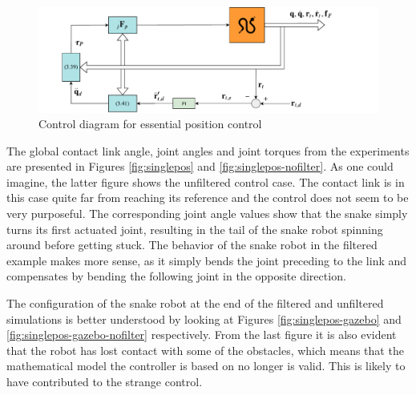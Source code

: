 \begin{figure}[H]
    \centering
    \includegraphics[trim=1cm 0cm 3cm 0cm, clip=true, width=\textwidth]{figures/experiments/control-diagrams/p-control-diagram.pdf}
    \caption{Control diagram for essential position control}
    \label{fig:diag-p}
\end{figure}

The global contact link angle, joint angles and joint torques from the experiments are presented in Figures \ref{fig:singlepos} and \ref{fig:singlepos-nofilter}. As one could imagine, the latter figure shows the unfiltered control case. The contact link is in this case quite far from reaching its reference and the control does not seem to be very purposeful. The corresponding joint angle values show that the snake simply turns its first actuated joint, resulting in the tail of the snake robot spinning around before getting stuck. The behavior of the snake robot in the filtered example makes more sense, as it simply bends the joint preceding to the link and compensates by bending the following joint in the opposite direction.

The configuration of the snake robot at the end of the filtered and unfiltered simulations is better understood by looking at Figures \ref{fig:singlepos-gazebo} and \ref{fig:singlepos-gazebo-nofilter} respectively. From the last figure it is also evident that the robot has lost contact with some of the obstacles, which means that the mathematical model the controller is based on no longer is valid. This is likely to have contributed to the strange control.

